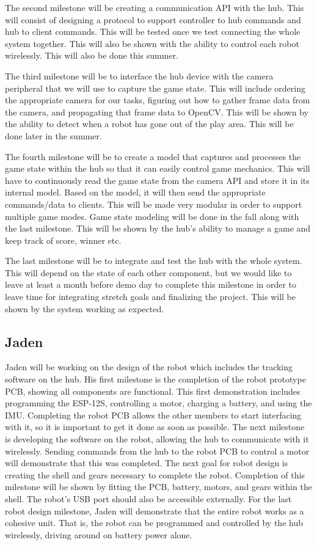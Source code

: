 \documentclass[11pt]{ieeeconf}
\begin{document}
The second milestone will be creating a communication API with the hub. This will consist of designing a protocol to support controller to hub commands and hub to client commands. This will be tested once we test connecting the whole system together. This will also be shown with the ability to control each robot wirelessly. This will also be done this summer.

The third milestone will be to interface the hub device with the camera peripheral that we will use to capture the game state. This will include ordering the appropriate camera for our tasks, figuring out how to gather frame data from the camera, and propagating that frame data to OpenCV. This will be shown by the ability to detect when a robot has gone out of the play area. This will be done later in the summer.

The fourth milestone will be to create a model that captures and processes the game state within the hub so that it can easily control game mechanics. This will have to continuously read the game state from the camera API and store it in its internal model. Based on the model, it will then send the appropriate commands/data to clients. This will be made very modular in order to support multiple game modes. Game state modeling will be done in the fall along with the last milestone. This will be shown by the hub's ability to manage a game and keep track of score, winner etc.

The last milestone will be to integrate and test the hub with the whole system. This will depend on the state of each other component, but we would like to leave at least a month before demo day to complete this milestone in order to leave time for integrating stretch goals and finalizing the project. This will be shown by the system working as expected.

\subsection{Jaden}
Jaden will be working on the design of the robot which includes the tracking software on the hub. His first milestone is the completion of the robot prototype PCB, showing all components are functional. This first demonstration includes programming the ESP-12S, controlling a motor, charging a battery, and using the IMU. Completing the robot PCB allows the other members to start interfacing with it, so it is important to get it done as soon as possible. The next milestone is developing the software on the robot, allowing the hub to communicate with it wirelessly. Sending commands from the hub to the robot PCB to control a motor will demonstrate that this was completed. The next goal for robot design is creating the shell and gears necessary to complete the robot. Completion of this milestone will be shown by fitting the PCB, battery, motors, and gears within the shell. The robot's USB port should also be accessible externally. For the last robot design milestone, Jaden will demonstrate that the entire robot works as a cohesive unit. That is, the robot can be programmed and controlled by the hub wirelessly, driving around on battery power alone.
\end{document}
